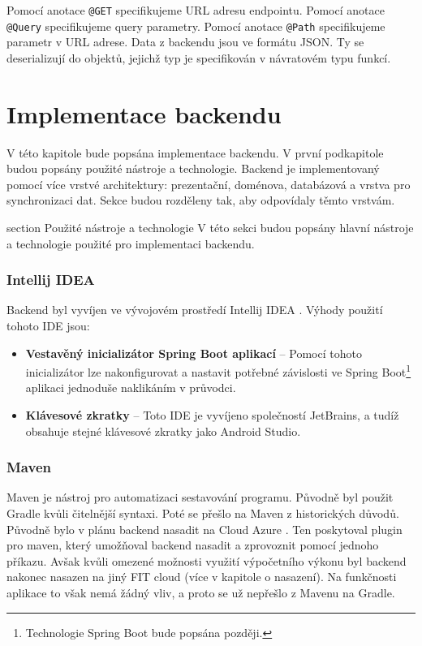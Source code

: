 \noindent Pomocí anotace \lstinline|@GET| specifikujeme URL adresu endpointu. Pomocí anotace \lstinline|@Query| specifikujeme query parametry. Pomocí anotace \lstinline|@Path| specifikujeme parametr v URL adrese. Data z backendu jsou ve formátu JSON. Ty se deserializují do objektů, jejichž typ je specifikován v návratovém typu funkcí.

\chapter{Implementace backendu}
V této kapitole bude popsána implementace backendu. V první podkapitole budou popsány použité nástroje a technologie. Backend je implementovaný pomocí více vrstvé \linebreak architektury: prezentační, doménova, databázová a vrstva pro synchronizaci dat. Sekce budou rozděleny tak, aby odpovídaly těmto vrstvám.

section {Použité nástroje a technologie}
V této sekci budou popsány hlavní nástroje a technologie použité pro implementaci backendu.

\subsection*{Intellij IDEA}
Backend byl vyvíjen ve vývojovém prostředí Intellij IDEA \cite{idea}. Výhody použití tohoto IDE jsou:
	
\begin{itemize}
	\item \textbf{Vestavěný inicializátor Spring Boot aplikací} -- Pomocí tohoto inicializátor lze nakonfigurovat a nastavit potřebné závislosti ve Spring Boot\footnote{Technologie Spring Boot bude popsána později.} aplikaci jednoduše naklikáním \linebreak v průvodci.
	
	\item \textbf{Klávesové zkratky} -- Toto IDE je vyvíjeno společností JetBrains, a tudíž obsahuje stejné klávesové zkratky jako Android Studio.
\end{itemize}

\subsection*{Maven}
Maven je nástroj pro automatizaci sestavování programu. Původně byl použit Gradle kvůli čitelnější syntaxi. Poté se přešlo na Maven z historických důvodů. Původně bylo v plánu backend nasadit na Cloud Azure \cite{azure}. Ten poskytoval plugin pro maven, který umožňoval backend nasadit a zprovoznit pomocí jednoho příkazu. Avšak kvůli omezené možnosti využití výpočetního výkonu byl backend nakonec nasazen na jiný FIT cloud (více v kapitole o nasazení). Na funkčnosti aplikace to však nemá žádný vliv, a proto se už nepřešlo z Mavenu na Gradle. 


